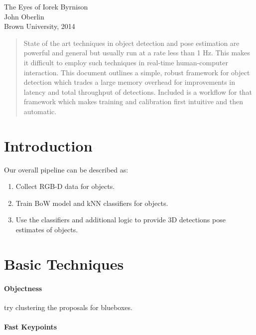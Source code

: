 \documentclass[12pt]{article}
\numberwithin{equation}{section}
\numberwithin{table}{section}
\numberwithin{figure}{section}
\begin{document}



\begin{center}
\textbf{\Large }The Eyes of Iorek Byrnison\\[6pt] 
John Oberlin\\
Brown University, 2014\\
\end{center}



\begin{abstract}
State of the art techniques in object detection and pose estimation
are powerful and general but usually run at a rate less than 1 Hz. This makes
it difficult to employ such techniques in real-time human-computer interaction.
This document outlines a simple, robust framework for object detection which 
trades a large memory overhead for improvements in latency and total throughput 
of detections. Included is a workflow for that framework which makes training
and calibration first intuitive and then automatic.
\end{abstract}



\section{Introduction}
Our overall pipeline can be described as:

\begin{enumerate}
  \item Collect RGB-D data for objects.
  \item Train BoW model and kNN classifiers for objects.
  \item Use the classifiers and additional logic to provide 3D detections pose estimates of objects.
\end{enumerate}

\section{Basic Techniques}
\paragraph{Objectness} try clustering the proposals for blueboxes.
\paragraph{Fast Keypoints}
\end{document}
